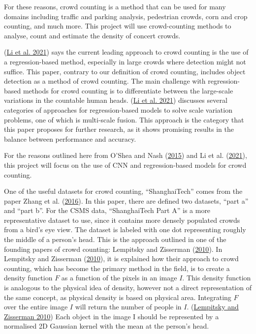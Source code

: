 \documentclass[
]{article}
\begin{document}
For these reasons, crowd counting is a method that can be used for many
domains including traffic and parking analysis, pedestrian crowds, corn
and crop counting, and much more. This project will use crowd-counting
methods to analyse, count and estimate the density of concert crowds.

(\protect\hyperlink{ref-li2021approaches}{Li et al. 2021}) says the
current leading approach to crowd counting is the use of a
regression-based method, especially in large crowds where detection
might not suffice. This paper, contrary to our definition of crowd
counting, includes object detection as a method of crowd counting. The
main challenge with regression-based methods for crowd counting is to
differentiate between the large-scale variations in the countable human
heads. (\protect\hyperlink{ref-li2021approaches}{Li et al. 2021})
discusses several categories of approaches for regression-based models
to solve scale variation problems, one of which is multi-scale fusion.
This approach is the category that this paper proposes for further
research, as it shows promising results in the balance between
performance and accuracy.

For the reasons outlined here from O'Shea and Nash
(\protect\hyperlink{ref-DBLP:journalsux2fcorrux2fOSheaN15}{2015}) and Li
et al. (\protect\hyperlink{ref-li2021approaches}{2021}), this project
will focus on the use of CNN and regression-based models for crowd
counting.

One of the useful datasets for crowd counting, ``ShanghaiTech'' comes
from the paper Zhang et al.
(\protect\hyperlink{ref-Zhang_2016_CVPR}{2016}). In this paper, there
are defined two datasets, ``part a'' and ``part b''. For the CSMS data,
``ShanghaiTech Part A'' is a more representative dataset to use, since
it contains more densely populated crowds from a bird's eye view. The
dataset is labeled with one dot representing roughly the middle of a
person's head. This is the approach outlined in one of the founding
papers of crowd counting: Lempitsky and Zisserman
(\protect\hyperlink{ref-NIPS2010_fe73f687}{2010}). In Lempitsky and
Zisserman (\protect\hyperlink{ref-NIPS2010_fe73f687}{2010}), it is
explained how their approach to crowd counting, which has become the
primary method in the field, is to create a density function \(F\) as a
function of the pixels in an image \(I\). This density function is
analogous to the physical idea of density, however not a direct
representation of the same concept, as physical density is based on
physical area. Integrating \(F\) over the entire image \(I\) will return
the number of people in \(I\).
(\protect\hyperlink{ref-NIPS2010_fe73f687}{Lempitsky and Zisserman
2010}) Each object in the image I should be represented by a normalised
2D Gaussian kernel with the mean at the person's head.
\end{document}
